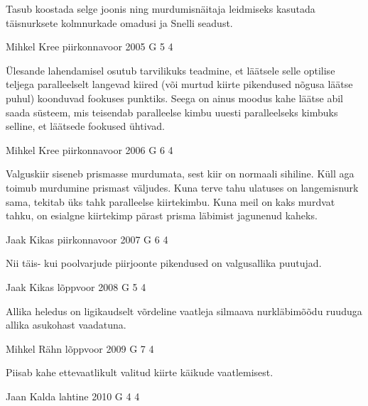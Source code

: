 \documentclass[11pt]{article}
\begin{document}
{{\ifHint
Tasub koostada selge joonis ning murdumisnäitaja leidmiseks kasutada täisnurksete kolmnurkade omadusi ja Snelli seadust.
\fi
}

{Mihkel Kree} %
{piirkonnavoor} %
{2005} %
{G 5} %
{4} %
{

\ifHint
Ülesande lahendamisel osutub tarvilikuks teadmine, et läätsele selle optilise teljega paralleelselt langevad kiired (või murtud kiirte pikendused nõgusa läätse puhul) koonduvad fookuses punktiks. Seega on ainus moodus kahe läätse abil saada süsteem, mis teisendab paralleelse kimbu uuesti paralleelseks kimbuks selline, et läätsede fookused ühtivad. 
\fi
}

{Mihkel Kree} %
{piirkonnavoor} %
{2006} %
{G 6} %
{4} %
{

\ifHint
Valguskiir siseneb prismasse murdumata, sest kiir on normaali sihiline. Küll aga toimub murdumine prismast väljudes. Kuna terve tahu ulatuses on langemisnurk sama, tekitab üks tahk paralleelse kiirtekimbu. Kuna meil on kaks murdvat tahku, on esialgne kiirtekimp pärast prisma läbimist jagunenud kaheks.
\fi
}

{Jaak Kikas} %
{piirkonnavoor} %
{2007} %
{G 6} %
{4} %
{

\ifHint
Nii täis- kui poolvarjude piirjoonte pikendused on valgusallika puutujad.
\fi
}

{Jaak Kikas} %
{lõppvoor} %
{2008} %
{G 5} %
{4} %
{

\ifHint
Allika heledus on ligikaudselt võrdeline vaatleja silmaava nurkläbimõõdu ruuduga allika asukohast vaadatuna.
\fi
}

{Mihkel Rähn} %
{lõppvoor} %
{2009} %
{G 7} %
{4} %
{

\ifHint
Piisab kahe ettevaatlikult valitud kiirte käikude vaatlemisest.
\fi
}

{Jaan Kalda} %
{lahtine} %
{2010} %
{G 4} %
{4} %
{

}}
\end{document}
